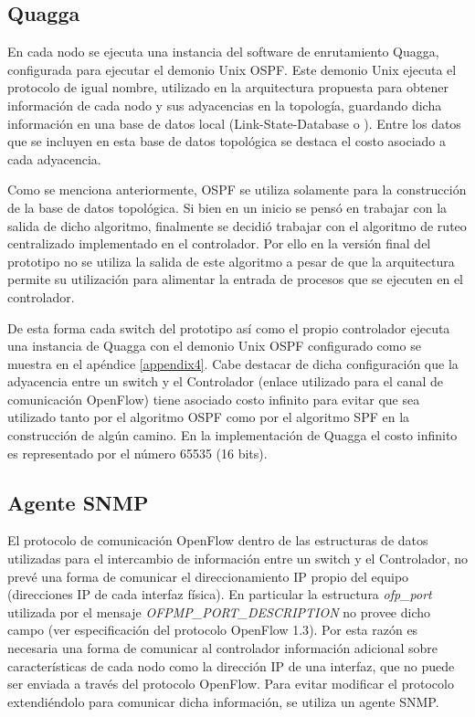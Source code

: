 \subsection{Quagga}
En cada nodo se ejecuta una instancia del software de enrutamiento Quagga, configurada para ejecutar el demonio Unix OSPF. Este demonio Unix ejecuta el protocolo de igual nombre, utilizado en la arquitectura propuesta para obtener información de cada nodo y sus adyacencias en la topolog\'ia, guardando dicha información en una base de datos local (Link-State-Database o ). Entre los datos que se incluyen en esta base de datos topol\'ogica se destaca el costo asociado a cada adyacencia.

Como se menciona anteriormente, OSPF se utiliza solamente para la construcci\'on de la base de datos topol\'ogica. Si bien en un inicio se pensó en trabajar con la salida de dicho algoritmo, finalmente se decidió trabajar con el algoritmo de ruteo centralizado implementado en el controlador. Por ello en la versi\'on final del prototipo no se utiliza la salida de este algoritmo a pesar de que la arquitectura permite su utilización para alimentar la entrada de procesos que se ejecuten en el controlador.

De esta forma cada switch del prototipo así como el propio controlador ejecuta una instancia de Quagga con el demonio Unix OSPF configurado como se muestra en el apéndice \ref{appendix4}. Cabe destacar de dicha configuración que la adyacencia entre un switch y el Controlador (enlace utilizado para el canal de comunicación OpenFlow) tiene asociado costo infinito para evitar que sea utilizado tanto por el algoritmo OSPF como por el algoritmo SPF en la construcción de algún camino. En la implementaci\'on de Quagga el costo infinito es representado por el n\'umero 65535 (16 bits).

\subsection{Agente SNMP}
El protocolo de comunicación OpenFlow dentro de las estructuras de datos utilizadas para el intercambio de información entre un switch y el Controlador, no prev\'e una forma de comunicar el direccionamiento IP propio del equipo (direcciones IP de cada interfaz física). En particular la estructura \textit{ofp\_port} utilizada por el mensaje \textit{OFPMP\_PORT\_DESCRIPTION} no provee dicho campo (ver especificación del protocolo OpenFlow 1.3\citep{ofv133spec}). Por esta razón es necesaria una forma de comunicar al controlador información adicional sobre características de cada nodo como la dirección IP de una interfaz, que no puede ser enviada a través del protocolo OpenFlow. Para evitar modificar el protocolo extendiéndolo para comunicar dicha informaci\'on, se utiliza un agente SNMP.


